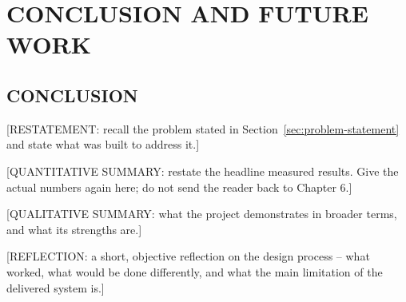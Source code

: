 %
%
\chapter{CONCLUSION AND FUTURE WORK}
\label{ch:conclusion}

\section{CONCLUSION}
\label{sec:conclusion}

[RESTATEMENT: recall the problem stated in
Section~\ref{sec:problem-statement} and state what was built to address
it.]

[QUANTITATIVE SUMMARY: restate the headline measured results. Give the
actual numbers again here; do not send the reader back to Chapter 6.]

[QUALITATIVE SUMMARY: what the project demonstrates in broader terms,
and what its strengths are.]

[REFLECTION: a short, objective reflection on the design process -- what
worked, what would be done differently, and what the main limitation of
the delivered system is.]

